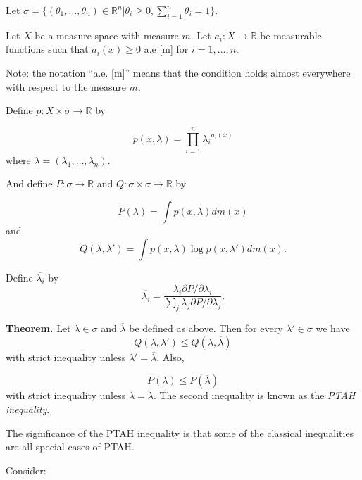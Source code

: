 \documentclass[12pt]{article}
\begin{document}
Let $\sigma = \{(\theta_1, \ldots , \theta_n) \in {\mathbb{R}}^{n}| \theta_i \ge 0, \sum_{i=1}^{n} \theta_i = 1\}$.


Let $X$ be a measure space with measure $m$. 
Let $a_i: X \to \mathbb{R}$ be measurable functions such that
$a_i(x) \ge 0$ a.e [m] for $i=1, \ldots, n$.

Note: the notation ``a.e. [m]'' means that the condition holds almost everywhere with respect to the measure $m$.

Define  $p: X \times \sigma \to \mathbb{R}$ by 


$$
 p(x, \lambda ) = \prod_{i=1}^n {\lambda_i}^{a_i(x)}
$$
where $\lambda = (\lambda_1, \ldots, \lambda_n)$.

And define $P: \sigma \to \mathbb{R}$ and $Q: \sigma \times \sigma \to \mathbb{R}$
by 

$$
P(\lambda ) = \int p(x,\lambda) dm(x)
$$
and 
$$
Q(\lambda, \lambda' ) = \int p(x,\lambda ) \log p(x, \lambda') dm(x).
$$

Define $\overline{\lambda_i}$ by
$$
\overline{\lambda_i} = \frac{\lambda_i \partial P/\partial \lambda_i}{\sum_j    \lambda_j \partial P /\partial \lambda_j}.
$$


\textbf{Theorem.} Let $\lambda \in \sigma$ and $\overline{\lambda}$ be defined
as above.  Then for every $\lambda' \in \sigma$ we have
$$
Q(\lambda , \lambda' ) \le Q(\lambda , \overline{\lambda})
$$
with strict inequality unless $\lambda' = \overline{\lambda}$. Also,

$$
P(\lambda ) \le P( \overline{\lambda})
$$
with strict inequality unless $\lambda = \overline{\lambda}$.
The second inequality is known as the \emph{PTAH inequality}.


The significance of the PTAH inequality is that some of the 
classical inequalities are all special cases of PTAH.

Consider:
\end{document}
